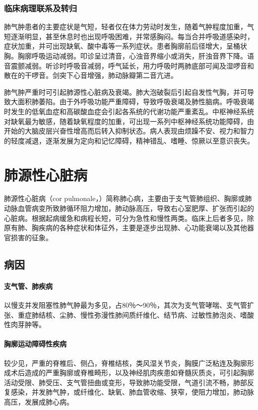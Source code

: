 \subsubsection{临床病理联系及转归}

肺气肿患者的主要症状是气短，轻者仅在体力劳动时发生，随着气肿程度加重，气短逐渐明显，甚至休息时也出现呼吸困难，并常感胸闷。每当合并呼吸道感染时，症状加重，并可出现缺氧、酸中毒等一系列症状。患者胸廓前后径增大，呈桶状胸。胸廓呼吸运动减弱。叩诊呈过清音，心浊音界缩小或消失，肝浊音界下降。语音震颤减弱。听诊时呼吸音减弱，呼气延长，用力呼吸时两肺底部可闻及湿啰音和散在的干啰音。剑突下心音增强，肺动脉瓣第二音亢进。

肺气肿严重时可引起肺源性心脏病及衰竭。肺大泡破裂后引起自发性气胸，并可导致大面积肺萎陷。由于外呼吸功能严重障碍，导致呼吸衰竭及肺性脑病。呼吸衰竭时发生的低氧血症和高碳酸血症会引起各系统的代谢功能严重紊乱。中枢神经系统对缺氧最为敏感，随着缺氧程度的加重，可出现一系列中枢神经系统功能障碍，由开始的大脑皮层兴奋性增高而后转入抑制状态。病人表现由烦躁不安、视力和智力的轻度减退，逐渐发展为定向和记忆障碍，精神错乱、嗜睡、惊厥以至意识丧失。

\section{肺源性心脏病}

肺源性心脏病（cor
pulmonale，）简称肺心病，主要由于支气管肺组织、胸廓或肺动脉血管病变所致肺循环阻力增加，肺动脉高压，导致右心室肥厚、扩张而引起的心脏病。根据起病缓急和病程长短，可分为急性和慢性两类。临床上后者多见，除原有肺、胸疾病的各种症状和体征外，主要是逐步出现肺、心功能衰竭以及其他器官损害的征象。

\subsection{病因}

\paragraph{支气管、肺疾病}
以慢支并发阻塞性肺气肿最为多见，占80％～90％，其次为支气管哮喘、支气管扩张、重症肺结核、尘肺、慢性弥漫性肺间质纤维化、结节病、过敏性肺泡炎、嗜酸性肉芽肿等。

\paragraph{胸廓运动障碍性疾病}
较少见，严重的脊椎后、侧凸，脊椎结核，类风湿关节炎，胸膜广泛粘连及胸廓形成术后造成的严重胸廓或脊椎畸形，以及神经肌肉疾患如脊髓灰质炎，可引起胸廓活动受限、肺受压、支气管扭曲或变形，导致肺功能受限，气道引流不畅，肺部反复感染，并发肺气肿，或纤维化、缺氧、肺血管收缩、狭窄，使阻力增加，肺动脉高压，发展成肺心病。

